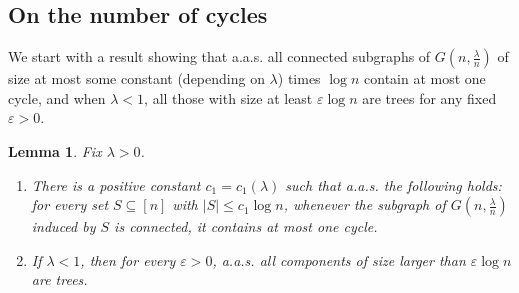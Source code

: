 \documentclass[10pt]{amsart}
\newtheorem{lemm}[theo]{Lemma}\newtheorem{prop}[theo]{Proposition}\newtheorem{coro}[theo]{Corollary}\newtheorem{conj}[theo]{Conjecture}
\theoremstyle{definition}\newtheorem{defi}[theo]{Definition}\newtheorem{rema}[theo]{Remark}\newtheorem{exam}[theo]{Example}\newtheorem{exem}[theo]{Example}\newtheorem{nota}[theo]{Notation}
\begin{document}
\subsection{On the number of cycles}

We start with a result showing that a.a.s. all connected subgraphs of $G(n, \tfrac{\lambda}{n})$ of size at most some constant (depending on $\lambda$) times $\log n$ contain at most one cycle, and when $\lambda<1$, all those with size at least $\varepsilon \log n$ are trees for any fixed $\varepsilon>0$.


\begin{lemm}\label{lem:2 cycles}
Fix $\lambda > 0$.
\begin{enumerate}
\item There is a positive constant $c_1=c_1(\lambda)$ such that a.a.s. the following holds: for every set $ S\subseteq [n]$ with $|S| \le c_1 \log n$, whenever the subgraph of $G(n,\tfrac{\lambda}{n})$ induced by $S$ is connected, it contains at most one cycle.
\item If $\lambda < 1$, then for every $\varepsilon>0$, a.a.s. all components of size larger than $\varepsilon \log n$ are trees.
\end{enumerate}
\end{lemm}
\end{document}
